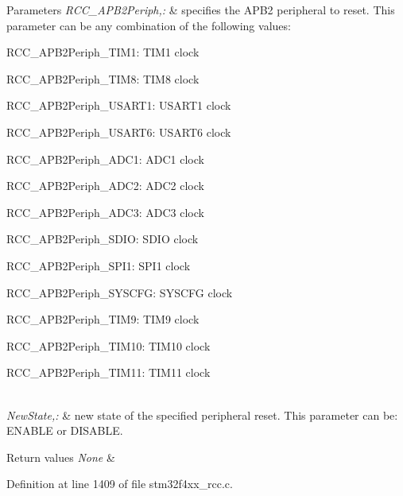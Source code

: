 \begin{DoxyParams}{Parameters}
{\em R\-C\-C\-\_\-\-A\-P\-B2\-Periph,\-:} & specifies the A\-P\-B2 peripheral to reset. This parameter can be any combination of the following values\-: \begin{DoxyItemize}
\item R\-C\-C\-\_\-\-A\-P\-B2\-Periph\-\_\-\-T\-I\-M1\-: T\-I\-M1 clock \item R\-C\-C\-\_\-\-A\-P\-B2\-Periph\-\_\-\-T\-I\-M8\-: T\-I\-M8 clock \item R\-C\-C\-\_\-\-A\-P\-B2\-Periph\-\_\-\-U\-S\-A\-R\-T1\-: U\-S\-A\-R\-T1 clock \item R\-C\-C\-\_\-\-A\-P\-B2\-Periph\-\_\-\-U\-S\-A\-R\-T6\-: U\-S\-A\-R\-T6 clock \item R\-C\-C\-\_\-\-A\-P\-B2\-Periph\-\_\-\-A\-D\-C1\-: A\-D\-C1 clock \item R\-C\-C\-\_\-\-A\-P\-B2\-Periph\-\_\-\-A\-D\-C2\-: A\-D\-C2 clock \item R\-C\-C\-\_\-\-A\-P\-B2\-Periph\-\_\-\-A\-D\-C3\-: A\-D\-C3 clock \item R\-C\-C\-\_\-\-A\-P\-B2\-Periph\-\_\-\-S\-D\-I\-O\-: S\-D\-I\-O clock \item R\-C\-C\-\_\-\-A\-P\-B2\-Periph\-\_\-\-S\-P\-I1\-: S\-P\-I1 clock \item R\-C\-C\-\_\-\-A\-P\-B2\-Periph\-\_\-\-S\-Y\-S\-C\-F\-G\-: S\-Y\-S\-C\-F\-G clock \item R\-C\-C\-\_\-\-A\-P\-B2\-Periph\-\_\-\-T\-I\-M9\-: T\-I\-M9 clock \item R\-C\-C\-\_\-\-A\-P\-B2\-Periph\-\_\-\-T\-I\-M10\-: T\-I\-M10 clock \item R\-C\-C\-\_\-\-A\-P\-B2\-Periph\-\_\-\-T\-I\-M11\-: T\-I\-M11 clock \end{DoxyItemize}
\\
\hline
{\em New\-State,\-:} & new state of the specified peripheral reset. This parameter can be\-: E\-N\-A\-B\-L\-E or D\-I\-S\-A\-B\-L\-E. \\
\hline
\end{DoxyParams}

\begin{DoxyRetVals}{Return values}
{\em None} & \\
\hline
\end{DoxyRetVals}


Definition at line 1409 of file stm32f4xx\-\_\-rcc.\-c.

